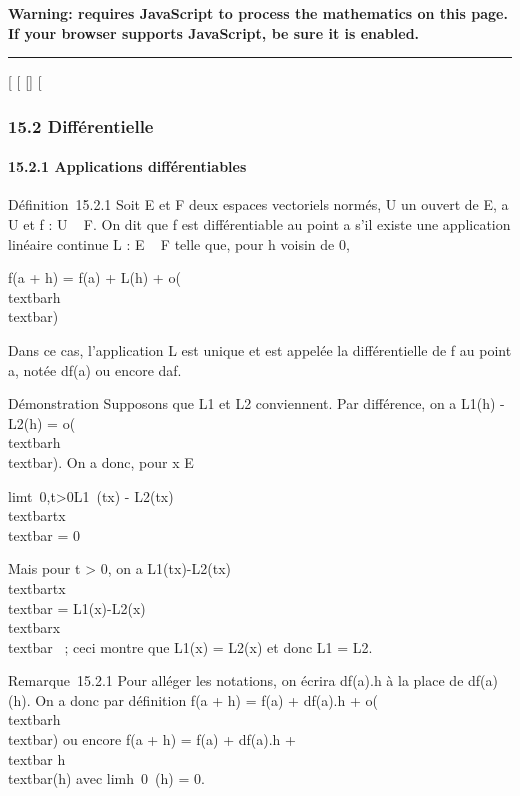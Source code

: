 \textbf{Warning: 
requires JavaScript to process the mathematics on this page.\\ If your
browser supports JavaScript, be sure it is enabled.}

\begin{center}\rule{3in}{0.4pt}\end{center}

{[}
{[}
{[}{]}
{[}

\subsubsection{15.2 Différentielle}

\paragraph{15.2.1 Applications différentiables}

Définition~15.2.1 Soit E et F deux espaces vectoriels normés, U un
ouvert de E, a \in U et f : U \rightarrow~ F. On dit que f est différentiable au
point a s'il existe une application linéaire continue L : E \rightarrow~ F telle
que, pour h voisin de 0,

f(a + h) = f(a) + L(h) +
o(\\textbar{}h\\textbar{})

Dans ce cas, l'application L est unique et est appelée la différentielle
de f au point a, notée df(a) ou encore daf.

Démonstration Supposons que L1 et L2 conviennent.
Par différence, on a L1(h) - L2(h) =
o(\\textbar{}h\\textbar{}). On a donc,
pour x \in E \diagdown\0\

limt\rightarrow~0,t\textgreater{}0L1~(tx)
- L2(tx)\over
\\textbar{}tx\\textbar{} = 0

Mais pour t \textgreater{} 0, on a
L1(tx)-L2(tx)\over
\\textbar{}tx\\textbar{} =
L1(x)-L2(x)\over
\\textbar{}x\\textbar{} ~; ceci montre
que L1(x) = L2(x) et donc L1 =
L2.

Remarque~15.2.1 Pour alléger les notations, on écrira df(a).h à la place
de \big {[}df(a)\big {]}(h). On a donc par
définition f(a + h) = f(a) + df(a).h +
o(\\textbar{}h\\textbar{}) ou encore f(a +
h) = f(a) + df(a).h +\\textbar{}
h\\textbar{}\epsilon(h) avec
limh\rightarrow~0~\epsilon(h) = 0.


